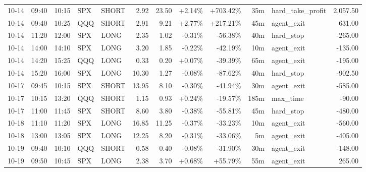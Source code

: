 \documentclass[11pt,a4paper,twoside]{article}
\begin{document}
\begin{center}
\begin{longtable}{>{\color{txtmain}}l l l l l r r r r r >{\color{txtmain}}l r}
10-14 & 09:40 & 10:15 & SPX & SHORT & 2.92 & 23.50 & \textcolor{wingreen}{+2.14\%} & \textcolor{wingreen}{+703.42\%} & 35m & hard\_take\_profit & \textcolor{wingreen}{2,057.50} \\
10-14 & 09:40 & 10:25 & QQQ & SHORT & 2.91 & 9.21 & \textcolor{wingreen}{+2.77\%} & \textcolor{wingreen}{+217.21\%} & 45m & agent\_exit & \textcolor{wingreen}{631.00} \\
10-14 & 11:20 & 12:00 & SPX & LONG & 2.35 & 1.02 & \textcolor{lossred}{-0.31\%} & \textcolor{lossred}{-56.38\%} & 40m & hard\_stop & \textcolor{lossred}{-265.00} \\
10-14 & 14:00 & 14:10 & SPX & LONG & 3.20 & 1.85 & \textcolor{lossred}{-0.22\%} & \textcolor{lossred}{-42.19\%} & 10m & agent\_exit & \textcolor{lossred}{-135.00} \\
10-14 & 14:20 & 15:25 & QQQ & LONG & 0.33 & 0.20 & \textcolor{wingreen}{+0.07\%} & \textcolor{lossred}{-39.39\%} & 65m & agent\_exit & \textcolor{lossred}{-195.00} \\
10-14 & 15:20 & 16:00 & SPX & LONG & 10.30 & 1.27 & \textcolor{lossred}{-0.08\%} & \textcolor{lossred}{-87.62\%} & 40m & hard\_stop & \textcolor{lossred}{-902.50} \\
10-17 & 09:45 & 10:15 & SPX & SHORT & 13.95 & 8.10 & \textcolor{lossred}{-0.30\%} & \textcolor{lossred}{-41.94\%} & 30m & agent\_exit & \textcolor{lossred}{-585.00} \\
10-17 & 10:15 & 13:20 & QQQ & SHORT & 1.15 & 0.93 & \textcolor{wingreen}{+0.24\%} & \textcolor{lossred}{-19.57\%} & 185m & max\_time & \textcolor{lossred}{-90.00} \\
10-17 & 11:00 & 11:45 & SPX & SHORT & 8.60 & 3.80 & \textcolor{lossred}{-0.38\%} & \textcolor{lossred}{-55.81\%} & 45m & hard\_stop & \textcolor{lossred}{-480.00} \\
10-18 & 11:10 & 11:20 & SPX & LONG & 16.85 & 11.25 & \textcolor{lossred}{-0.37\%} & \textcolor{lossred}{-33.23\%} & 10m & agent\_exit & \textcolor{lossred}{-560.00} \\
10-18 & 13:00 & 13:05 & SPX & LONG & 12.25 & 8.20 & \textcolor{lossred}{-0.31\%} & \textcolor{lossred}{-33.06\%} & 5m & agent\_exit & \textcolor{lossred}{-405.00} \\
10-19 & 09:40 & 10:10 & QQQ & SHORT & 0.58 & 0.40 & \textcolor{lossred}{-0.08\%} & \textcolor{lossred}{-31.90\%} & 30m & agent\_exit & \textcolor{lossred}{-148.00} \\
10-19 & 09:50 & 10:45 & SPX & LONG & 2.38 & 3.70 & \textcolor{wingreen}{+0.68\%} & \textcolor{wingreen}{+55.79\%} & 55m & agent\_exit & \textcolor{wingreen}{265.00} \\

\end{longtable}
\end{center}
\end{document}
